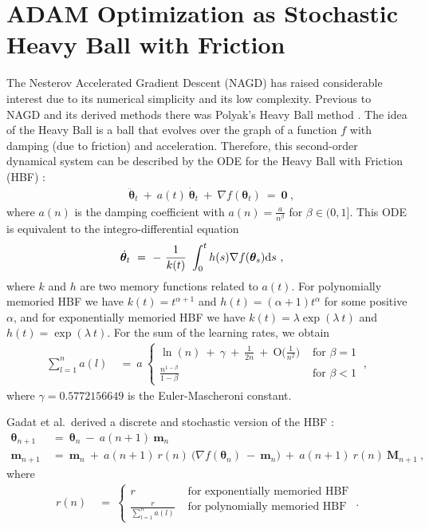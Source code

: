 \documentclass{article}
\newcommand\Bm{\bm{m}}
\newcommand\BM{\bm{M}}
\newcommand\Bth{\bm{\theta}}
\newcommand\BZe{\bm{0}}
\newcommand{\rO}{\mathrm{O}} \newcommand{\rP}{\mathrm{P}}
\begin{document}
\section{ADAM Optimization as Stochastic Heavy Ball with Friction}
\label{sec:adam}


The Nesterov Accelerated Gradient
Descent (NAGD) \cite{Nesterov:83} has raised considerable interest due to its numerical
simplicity and its low complexity. Previous to NAGD and its derived
methods there was Polyak's Heavy Ball method \cite{Polyak:64}.
The idea of the Heavy Ball is a ball that evolves over the graph of a function $f$
with damping (due to friction) and acceleration. Therefore, this
second-order dynamical system can be described by the ODE for the
Heavy Ball with Friction (HBF) \cite{Gadat:16}:
\begin{align}
&\ddot{\Bth}_t \ + \ a(t) \ \dot{\Bth}_t \ + \ \nabla f(\Bth_t)
\ = \ \BZe  \ ,
\end{align}
where $a(n)$ is the damping coefficient with
$a(n)=\frac{a}{n^{\beta}}$ for $\beta \in (0,1]$.
This ODE is equivalent to the integro-differential equation
\begin{align}
&\dot{\Bth}_t \ = \ - \ \frac{1}{k(t)} \ \int_{0}^{t} h(s) \nabla
  f(\Bth_s) \Rd s \ ,
\end{align}
where $k$ and $h$ are two memory functions related to $a(t)$.
For polynomially memoried HBF we have $k(t)=t^{\alpha+1}$ and $h(t)=(\alpha +1 ) t^{\alpha}$ for some positive
$\alpha$, and for exponentially
memoried HBF we have $k(t)=\lambda \exp(\lambda \ t)$ and
$h(t)=\exp(\lambda \ t)$.
For the sum of the learning rates, we obtain
\begin{align}
\sum_{l=1}^{n} a(l) \ &= \
a \
\begin{cases}
\ln(n) \ + \ \gamma \ + \ \frac{1}{2n}
\ + \ \rO\big(\frac{1}{n^2} \big) & \mbox{ for } \beta=1 \\
\frac{n^{1-\beta}}{1-\beta} & \mbox{ for } \beta<1
\end{cases} \ ,
\end{align}
where $\gamma=0.5772156649$ is the Euler-Mascheroni constant.


Gadat et al.\ derived a discrete and stochastic version of the HBF \cite{Gadat:16}:
\begin{align}
\label{eq:hbf}
\Bth_{n+1} \ &= \ \Bth_n \ - \ a(n+1) \ \Bm_n \\ \nonumber
\Bm_{n+1} \ &= \ \Bm_n \ + \  a(n+1) \ r(n) \
\big( \nabla f(\Bth_n) \ - \ \Bm_n \big) \ + \
a(n+1) \ r(n) \ \BM_{n+1} \ ,
\end{align}
where
\begin{align}
r(n) \ &= \
\begin{cases}
r  & \mbox{ for exponentially memoried HBF} \\
\frac{r}{\sum_{l=1}^{n} a(l) } & \mbox{ for polynomially memoried HBF}
\end{cases} \ .
\end{align}
\end{document}
